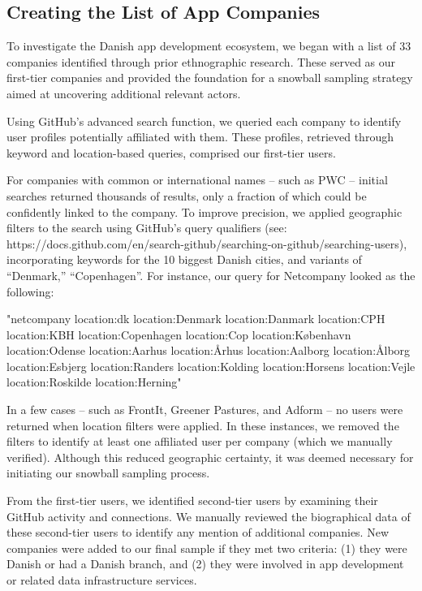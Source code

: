 \subsection{Creating the List of App Companies}

To investigate the Danish app development ecosystem, we began with a list of 33 companies identified through prior ethnographic research. These served as our first-tier companies and provided the foundation for a snowball sampling strategy aimed at uncovering additional relevant actors.

Using GitHub’s advanced search function, we queried each company to identify user profiles potentially affiliated with them. These profiles, retrieved through keyword and location-based queries, comprised our first-tier users.

For companies with common or international names -- such as PWC -- initial searches returned thousands of results, only a fraction of which could be confidently linked to the company. To improve precision, we applied geographic filters to the search using GitHub’s query qualifiers (see: https://docs.github.com/en/search-github/searching-on-github/searching-users), incorporating keywords for the 10 biggest Danish cities, and variants of “Denmark,” “Copenhagen”. For instance, our query for Netcompany looked as the following:

"netcompany location:dk location:Denmark location:Danmark location:CPH location:KBH location:Copenhagen location:Cop location:København location:Odense location:Aarhus location:Århus location:Aalborg location:Ålborg location:Esbjerg location:Randers location:Kolding location:Horsens location:Vejle location:Roskilde location:Herning"

In a few cases -- such as FrontIt, Greener Pastures, and Adform -- no users were returned when location filters were applied. In these instances, we removed the filters to identify at least one affiliated user per company (which we manually verified). Although this reduced geographic certainty, it was deemed necessary for initiating our snowball sampling process.

From the first-tier users, we identified second-tier users by examining their GitHub activity and connections. We manually reviewed the biographical data of these second-tier users to identify any mention of additional companies. New companies were added to our final sample if they met two criteria: (1) they were Danish or had a Danish branch, and (2) they were involved in app development or related data infrastructure services.

